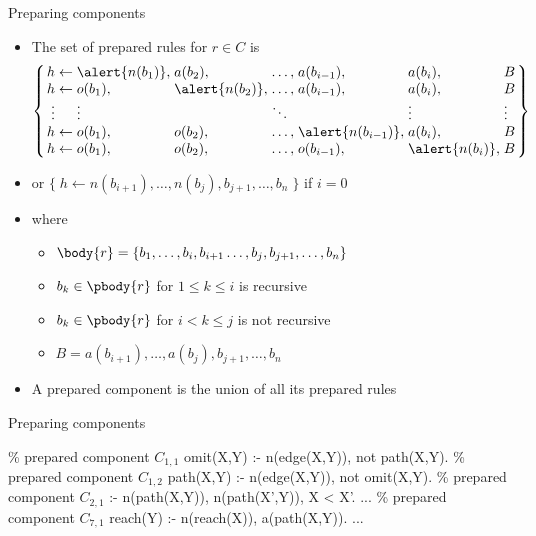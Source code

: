 \begin{frame}{Preparing components}

  \begin{itemize}
    \item The set of \alert{prepared rules} for \(r \in C\) is
          \[\arraycolsep=1.4pt
            \left\{
            \begin{array}{rcllllllll}
              h      & \leftarrow & \alert{n(b_1)}, & a(b_2) ,        & \dots, & a(b_{i-1}) ,        & a(b_i),         & B      \\
              h      & \leftarrow & o(b_1) ,        & \alert{n(b_2)}, & \dots, & a(b_{i-1}) ,        & a(b_i),         & B      \\
              \vdots &            & \vdots          &                 & \ddots &                     & \vdots          & \vdots \\
              h      & \leftarrow & o(b_1) ,        & o(b_2) ,        & \dots, & \alert{n(b_{i-1})}, & a(b_i),         & B      \\
              h      & \leftarrow & o(b_1) ,        & o(b_2) ,        & \dots, & o(b_{i-1}) ,        & \alert{n(b_i)}, & B
            \end{array}
            \right\}
          \]
    \item [] or \quad \(\{\;h \leftarrow n(b_{i+1}), \dots, n(b_j), b_{j+1}, \dots, b_n\;\}\) \quad if \(i=0\)
    \item [] where
          \begin{itemize}
            \item \(\body{r} = \{ b_1, \dots, b_i, b_{i+1} \dots, b_j, b_{j+1}, \dots, b_n \}\)
            \item \(b_k\in\pbody{r}\) for \(1\leq k \leq i\) is recursive
            \item \(b_k\in\pbody{r}\) for \(i< k \leq j\) is not recursive
            \item \(B = a(b_{i+1}), \dots, a(b_j), b_{j+1}, \dots, b_n\)
          \end{itemize}
    \item<2-> A \alert{prepared component} is the union of all its prepared rules
  \end{itemize}
\end{frame}
\begin{frame}[fragile]{Preparing components}
  \newcommand{\Component}[1]{\(C_{#1}\)}
  \begin{SemiVerbatim}{.9}
    {\color{comment}\% prepared component \Component{1,1}}
    omit(X,Y) :- \alert{n(edge(X,Y))}, not path(X,Y).
      {\color{comment}\% prepared component \Component{1,2}}
    path(X,Y) :- \alert{n(edge(X,Y))}, not omit(X,Y).
      {\color{comment}\% prepared component \Component{2,1}}
    :- \alert{n(path(X,Y))}, \alert{n(path(X',Y))}, X < X'.
    ...
      {\color{comment}\% prepared component \Component{7,1}}
    reach(Y) :- \alert{n(reach(X))}, \alert{a(path(X,Y))}.
    ...
  \end{SemiVerbatim}
\end{frame}
